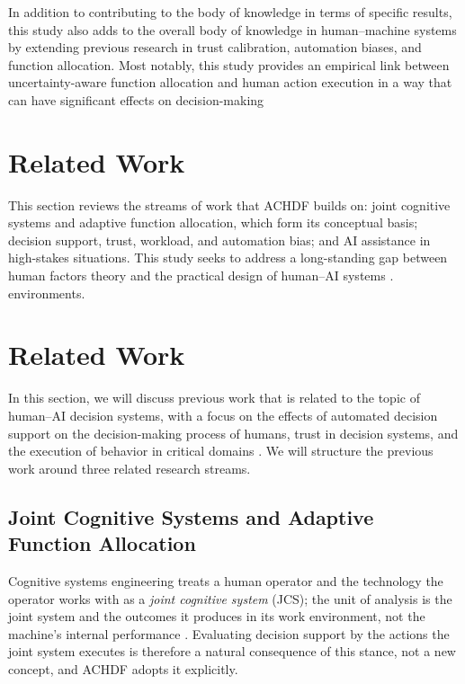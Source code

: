 \documentclass[journal]{IEEEtran}
\theoremstyle{plain}
\theoremstyle{definition}
\providecommand{\DIFaddtex}[1]{{\protect\color{blue} \sf #1}} %
\providecommand{\DIFdeltex}[1]{{\protect\color{red} \scriptsize #1}} %
\providecommand{\DIFaddbegin}{} %
\providecommand{\DIFaddend}{} %
\providecommand{\DIFdelbegin}{} %
\providecommand{\DIFdelend}{} %
\providecommand{\DIFadd}[1]{\texorpdfstring{\DIFaddtex{#1}}{#1}} %
\providecommand{\DIFdel}[1]{\texorpdfstring{\DIFdeltex{#1}}{}} %
\newcommand{\DIFscaledelfig}{0.5}
\newlength{\DIFdelgraphicswidth} %
\newlength{\DIFdelgraphicsheight} %
\newcommand{\DIFaddincludegraphics}[2][]{{\color{blue}\fbox{\DIFOincludegraphics[#1]{#2}}}} %
\newcommand{\DIFdelincludegraphics}[2][]{%
\sbox{\DIFdelgraphicsbox}{\DIFOincludegraphics[#1]{#2}}%
\settoboxwidth{\DIFdelgraphicswidth}{\DIFdelgraphicsbox} %
\settoboxtotalheight{\DIFdelgraphicsheight}{\DIFdelgraphicsbox} %
\scalebox{\DIFscaledelfig}{%
\parbox[b]{\DIFdelgraphicswidth}{\usebox{\DIFdelgraphicsbox}\\[-\baselineskip] \rule{\DIFdelgraphicswidth}{0em}}\llap{\resizebox{\DIFdelgraphicswidth}{\DIFdelgraphicsheight}{%
\setlength{\unitlength}{\DIFdelgraphicswidth}%
\begin{picture}(1,1)%
\thicklines\linethickness{2pt} %
{\color[rgb]{1,0,0}\put(0,0){\framebox(1,1){}}}%
{\color[rgb]{1,0,0}\put(0,0){\line( 1,1){1}}}%
{\color[rgb]{1,0,0}\put(0,1){\line(1,-1){1}}}%
\end{picture}%
}\hspace*{3pt}}} %
} %
\DeclareRobustCommand{\DIFaddbegin}{\DIFOaddbegin \let\includegraphics\DIFaddincludegraphics} %
\DeclareRobustCommand{\DIFaddend}{\DIFOaddend \let\includegraphics\DIFOincludegraphics} %
\DeclareRobustCommand{\DIFdelbegin}{\DIFOdelbegin \let\includegraphics\DIFdelincludegraphics} %
\DeclareRobustCommand{\DIFdelend}{\DIFOaddend \let\includegraphics\DIFOincludegraphics} %
\begin{document}
    \DIFdelbegin \DIFdel{In addition to contributing to the body of knowledge in terms of specific results, this study also adds to the overall body of knowledge in human--machine systems by extending previous research in trust calibration, automation biases, and function allocation. Most notably, this study provides an empirical link between uncertainty-aware function allocation and human action execution in a way that can have significant effects on decision-making }\DIFdelend %
\DIFaddbegin \section{\DIFadd{Related Work}}
\DIFadd{This section reviews the streams of work that ACHDF builds on: joint cognitive systems and adaptive function allocation, which form its conceptual basis; decision support, trust, workload, and automation bias; and AI assistance }\DIFaddend in high-stakes \DIFdelbegin \DIFdel{situations.
This study seeks to address a long-standing gap between human factors theory and the practical design of human--AI systems \cite{Yang2022THMSReview,Hodgson2013THMS,Lai2023FAccT}.
}\DIFdelend \DIFaddbegin \DIFadd{environments.
}\DIFaddend 

\DIFdelbegin \section{\DIFdel{Related Work}}
\addtocounter{section}{-1}%
\DIFdel{In this section, we will discuss previous work that is related to the topic of human--AI decision systems, with a focus on the effects of automated decision support on the decision-making process of humans, trust in decision systems, and the execution of behavior in critical domains \cite{Bach2024Access,PerezCerrolaza2024CSUR,Yang2022THMSReview,Lai2023FAccT}. We will structure the previous work around three related research streams. }\DIFdelend \DIFaddbegin \subsection{\DIFadd{Joint Cognitive Systems and Adaptive Function Allocation}}
\DIFadd{Cognitive systems engineering treats a human operator and the technology the operator works with as a \emph{joint cognitive system} (JCS); the unit of analysis is the joint system and the outcomes it produces in its work environment, not the machine's internal performance \cite{Hollnagel2005JCS,Woods2006JCS}. Evaluating decision support by the actions the joint system executes is therefore a natural consequence of this stance, not a new concept, and ACHDF adopts it explicitly.
}\DIFaddend 
\end{document}
